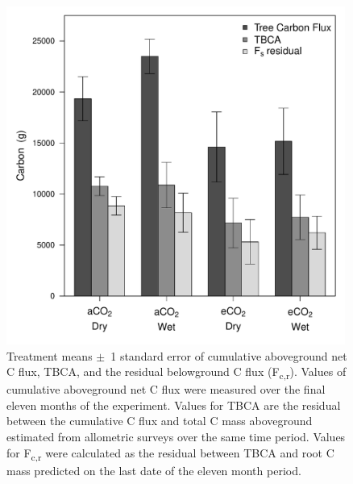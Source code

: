 \documentclass[a4paper]{article}\usepackage[]{graphicx}\usepackage[]{color}
\begin{document}
\begin{figure}[h!]
    \centering
    \includegraphics[width=0.99\textwidth]{belowground_flux_plots2.pdf}
    \caption{Treatment means $\pm$~1 standard error of cumulative aboveground net C flux, TBCA, and the residual belowground C flux (F\textsubscript{c,r}). Values of cumulative aboveground net C flux were measured over the final eleven months of the experiment. Values for TBCA are the residual between the cumulative C flux and total C mass aboveground estimated from allometric surveys over the same time period. Values for F\textsubscript{c,r} were calculated as the residual between TBCA and root C mass predicted on the last date of the eleven month period.}
    \label{fig:figure 4.7}
\end{figure}
\end{document}
